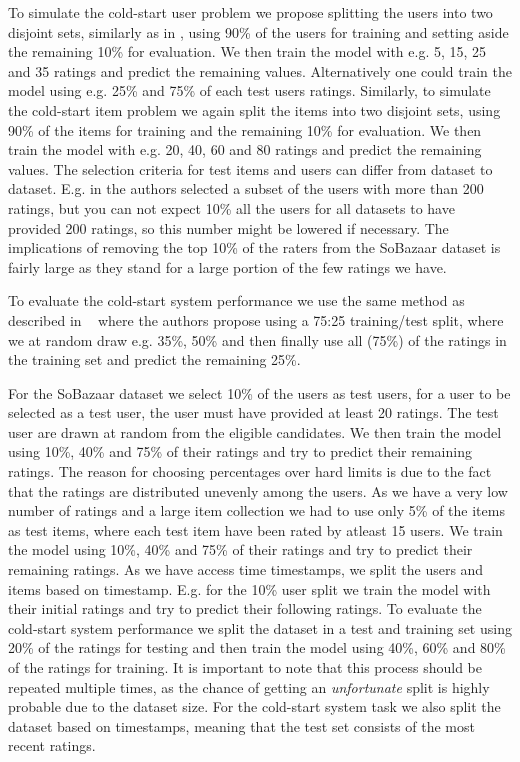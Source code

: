 To simulate the cold-start user problem we propose splitting the users into two disjoint
sets, similarly as in \cite{Stern2009, Lam2008}, using 90\% of the users for training and
setting aside the remaining 10\% for evaluation. We then train the model with e.g. 5, 15,
25 and 35 ratings and predict the remaining values. Alternatively one could train the model
using e.g. 25\% and 75\% of each test users ratings. Similarly, to simulate the cold-start
item problem we again split the items into two disjoint sets, using 90\% of the items
for training and the remaining 10\% for evaluation.  We then train the model with
e.g. 20, 40, 60 and 80 ratings and predict the remaining values. The selection criteria
for test items and users can differ from dataset to dataset. E.g. in \cite{Rashid2002, Rashid2008}
the authors selected a subset of the users with more than 200 ratings, but you can not
expect 10\% all the users for all datasets to have provided 200 ratings, so this number
might be lowered if necessary. The implications of removing the top 10\% of the
raters from the SoBazaar dataset is fairly large as they stand for a large portion
of the few ratings we have.

To evaluate the cold-start system performance we use the same method as described
in ~\cite{Agarwal2009} where the authors propose using a 75:25 training/test split,
where we at random draw e.g. 35\%, 50\% and then finally use all (75\%) of the
ratings in the training set and predict the remaining 25\%.



For the SoBazaar dataset we select 10\% of the users as test users, for a user to be
selected as a test user, the user must have provided at least 20 ratings. The test user are drawn
at random from the eligible candidates. We then train
the model using 10\%, 40\% and 75\% of their ratings and try to predict their remaining ratings.
The reason for choosing percentages over hard limits is due to the fact that the ratings are
distributed unevenly among the users. As we have a very low number of ratings and a large item collection we had to use
only 5\% of the items as test items, where each test item have been rated by atleast 15 users.
We train the model using 10\%, 40\% and 75\% of their ratings and try to predict their remaining
ratings. As we have access time timestamps, we split the users and items based on timestamp.
E.g. for the 10\% user split we train the model with their initial ratings and try to predict
their following ratings. To evaluate the cold-start system performance we split the dataset in a test
and training set using 20\% of the ratings for testing and then train the model
using 40\%, 60\% and 80\% of the ratings for training. It is important to note that
this process should be repeated multiple times, as the chance of getting an
\emph{unfortunate} split is highly probable due to the dataset size. For the cold-start
system task we also split the dataset based on timestamps, meaning that the test set consists
of the most recent ratings.

